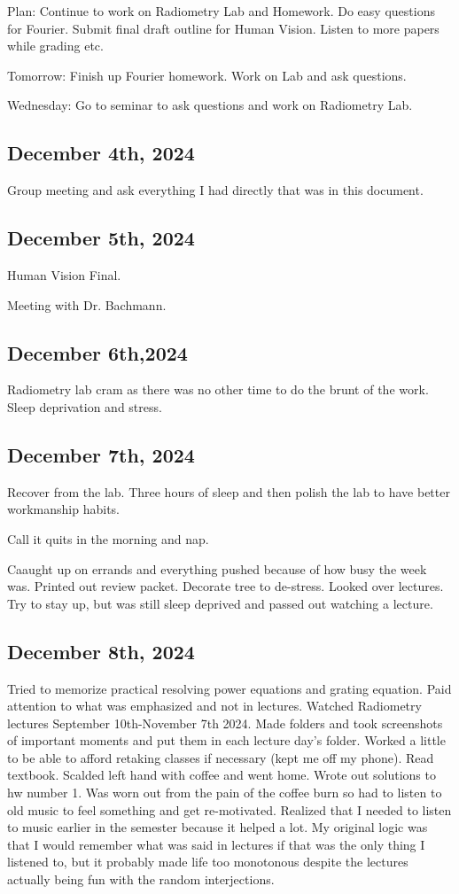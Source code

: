 \documentclass{article}
\begin{document}
Plan: 
Continue to work on Radiometry Lab and Homework. Do easy questions for Fourier. Submit final draft outline for Human Vision. Listen to more papers while grading etc. 

Tomorrow: Finish up Fourier homework. Work on Lab and ask questions. 

Wednesday: Go to seminar to ask questions and work on Radiometry Lab. 



\subsection{December 4th, 2024}
Group meeting and ask everything I had directly that was in this document. 

\subsection{December 5th, 2024}
Human Vision Final. 


Meeting with Dr. Bachmann. 
\subsection{December 6th,2024}
Radiometry lab cram as there was no other time to do the brunt of the work. Sleep deprivation and stress. 

\subsection{December 7th, 2024}
Recover from the lab. Three hours of sleep and then polish the lab to have better workmanship habits. 

Call it quits in the morning and nap. 

Caaught up on errands and everything pushed because of how busy the week was. Printed out review packet. Decorate tree to de-stress. 
Looked over lectures. Try to stay up, but was still sleep deprived and passed out watching a lecture. 

\subsection{December 8th, 2024}
Tried to memorize practical resolving power equations and grating equation. Paid attention to what was emphasized and not in lectures. 
Watched Radiometry lectures September 10th-November 7th 2024. Made folders and took screenshots of important moments and put them in each lecture day's folder. Worked a little to be able to afford retaking classes if necessary (kept me off my phone). 
Read textbook. Scalded left hand with coffee and went home. 
Wrote out solutions to hw number 1. Was worn out from the pain of the coffee burn so had to listen to old music to feel something and get re-motivated. Realized that I needed to listen to music earlier in the semester because it helped a lot. My original logic was that I would remember what was said in lectures if that was the only thing I listened to, but it probably made life too monotonous despite the lectures actually being fun with the random interjections.  
\end{document}
